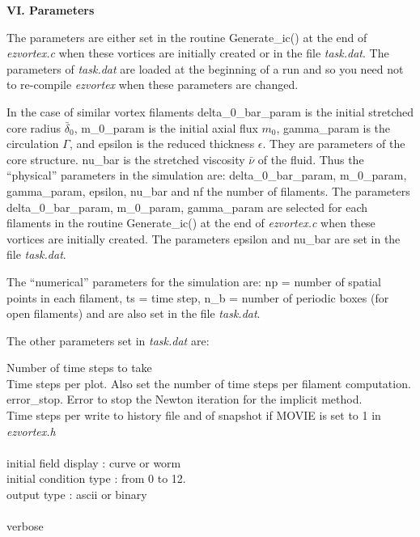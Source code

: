 \medskip
{\bf VI.  Parameters} 
\smallskip

 The parameters are either set in the routine {\sf Generate\_ic()} at the end of {\em ezvortex.c} when these vortices are initially created or in the file {\em task.dat}. The parameters of {\em task.dat} are loaded at the beginning of a run and so you need not to re-compile {\em ezvortex} when these parameters are  changed.

In the case of similar vortex filaments {\sf delta\_0\_bar\_param} is the initial stretched core radius $\bar{\delta}_0$, {\sf m\_0\_param} is the initial axial flux $m_0$, {\sf gamma\_param} is the circulation  $\Gamma$,  and {\sf epsilon}  is the reduced thickness $\epsilon$. They  are parameters of the core structure. {\sf nu\_bar}  is the stretched viscosity $\bar{\nu}$ of the fluid. Thus the ``physical'' parameters
in the simulation are: {\sf delta\_0\_bar\_param}, {\sf m\_0\_param}, {\sf gamma\_param}, {\sf epsilon}, {\sf nu\_bar} and {\sf nf} the number of filaments.  The parameters {\sf delta\_0\_bar\_param}, {\sf m\_0\_param}, {\sf gamma\_param}  are selected for each filaments in the routine {\sf Generate\_ic()} at the end of {\em ezvortex.c} when these vortices are initially created. The parameters {\sf epsilon} and {\sf nu\_bar} are set in the file {\em task.dat}.

The ``numerical'' parameters for the simulation are: {\sf np}
= number of spatial points in each filament, {\sf ts} = time
step, 
{\sf n\_b} = number of periodic boxes (for open filaments)
 and are also set in the file {\em task.dat}. 

The other parameters set in
{\em task.dat} are:

\begin{list}{dummy}
{\partopsep=-10pt\parsep=-10pt\itemsep=0pt}
\item[~]{\sf Number of time steps to take} \\
        {\sf Time steps per plot.} Also set the number of time
        steps per filament computation. \\
        {\sf error\_stop.} Error to stop the Newton iteration for the implicit method.  \\
        {\sf Time steps per write} to history file and of snapshot if {\sf MOVIE} is set to 1 in {\em ezvortex.h} \\ 
	\\
	{\sf initial field display} : curve or worm \\
	{\sf initial condition type} : from 0 to 12.  \\
	{\sf output type} : ascii or binary \\
	\\
	{\sf verbose} 
\end{list}

